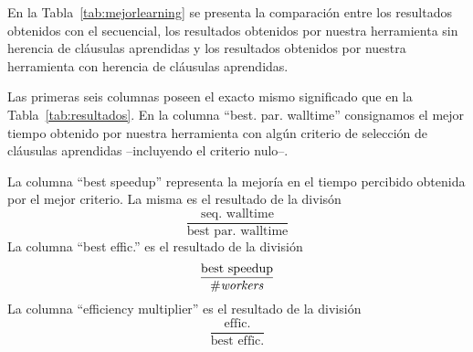 En la Tabla~\ref{tab:mejorlearning} se presenta la comparación entre los
resultados obtenidos con el \ssolver secuencial, los resultados obtenidos por
nuestra herramienta sin herencia de cláusulas aprendidas y los resultados
obtenidos por nuestra herramienta con herencia de cláusulas aprendidas.

Las primeras seis columnas poseen el exacto mismo significado que en la
Tabla~\ref{tab:resultados}. En la columna ``best. par. walltime'' consignamos
el mejor tiempo obtenido por nuestra herramienta con algún criterio de
selección de cláusulas aprendidas --incluyendo el criterio nulo--.

La columna ``best speedup'' representa la mejoría en el tiempo percibido
obtenida por el mejor criterio. La misma es el resultado de la divisón
$$\frac{\text{seq. walltime}}{\text{best par. walltime}}$$ La columna ``best
effic.'' es el resultado de la división $$\frac{\text{best
speedup}}{\text{\#\emph{workers}}}$$ La columna ``efficiency multiplier'' es el resultado
de la división $$\frac{\text{effic.}}{\text{best effic.}}$$


